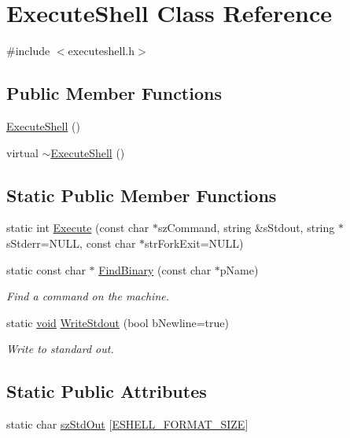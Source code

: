 \hypertarget{class_execute_shell}{\section{\-Execute\-Shell \-Class \-Reference}
\label{class_execute_shell}
}


{\ttfamily \#include $<$executeshell.\-h$>$}

\subsection*{\-Public \-Member \-Functions}
\begin{DoxyCompactItemize}
\item 
\hyperlink{class_execute_shell_af585b729cdbe3ca0e028468247fdd788}{\-Execute\-Shell} ()
\item 
virtual \hyperlink{class_execute_shell_a8aeca6da175e2239087c4b1495f46afb}{$\sim$\-Execute\-Shell} ()
\end{DoxyCompactItemize}
\subsection*{\-Static \-Public \-Member \-Functions}
\begin{DoxyCompactItemize}
\item 
static int \hyperlink{class_execute_shell_a40c30a548a494978d60c11b6b4ea2387}{\-Execute} (const char $\ast$sz\-Command, string \&s\-Stdout, string $\ast$s\-Stderr=\-N\-U\-L\-L, const char $\ast$str\-Fork\-Exit=\-N\-U\-L\-L)
\item 
static const char $\ast$ \hyperlink{class_execute_shell_a545144d7b477ebb452d5133b1981e6d2}{\-Find\-Binary} (const char $\ast$p\-Name)
\begin{DoxyCompactList}\small\item\em \-Find a command on the machine. \end{DoxyCompactList}\item 
static \hyperlink{_cpclient_8h_a6464f7480a0fd0ee170cba12b2c0497f}{void} \hyperlink{class_execute_shell_a7c1f468edf0872cdaf95a6c49edf7d0d}{\-Write\-Stdout} (bool b\-Newline=true)
\begin{DoxyCompactList}\small\item\em \-Write to standard out. \end{DoxyCompactList}\end{DoxyCompactItemize}
\subsection*{\-Static \-Public \-Attributes}
\begin{DoxyCompactItemize}
\item 
static char \hyperlink{class_execute_shell_acd285de44e4ebed60f717e80b26ff530}{sz\-Std\-Out} \mbox{[}\hyperlink{executeshell_8h_af3ff463ba5cc7b03377f51827fffb53b}{\-E\-S\-H\-E\-L\-L\-\_\-\-F\-O\-R\-M\-A\-T\-\_\-\-S\-I\-Z\-E}\mbox{]}
\end{DoxyCompactItemize}


